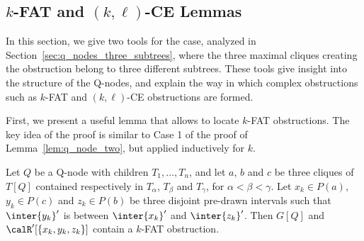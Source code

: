 \subsection{$k$-FAT and $(k,\ell)$-CE Lemmas} \label{sec:q_nodes_k_fat}

In this section, we give two tools for the case, analyzed in
Section~\ref{sec:q_nodes_three_subtrees}, where the three maximal cliques creating the obstruction belong to
three different subtrees. These tools give insight into the structure of the Q-nodes, and explain
the way in which complex obstructions such as $k$-FAT and $(k,\ell)$-CE obstructions are formed.

 First, we present a useful lemma that allows to locate $k$-FAT
obstructions. The key idea of the proof is similar to Case 1 of the proof of
Lemma~\ref{lem:q_node_two}, but applied inductively for $k$. 

\begin{lemma} \label{lem:k_fat}
Let $Q$ be a Q-node with children $T_1,\dots,T_n$, and let $a$, $b$ and $c$ be three cliques of
$T[Q]$ contained respectively in $T_\alpha$, $T_\beta$ and $T_\gamma$, for $\alpha < \beta < \gamma$.
Let $x_k \in P(a)$, $y_k \in P(c)$ and $z_k \in P(b)$ be three disjoint pre-drawn intervals such
that $\inter{y_k}'$ is between $\inter{x_k}'$ and $\inter{z_k}'$. Then $G[Q]$ and
$\calR'[\{x_k,y_k,z_k\}]$ contain a $k$-FAT obstruction.
\end{lemma}

